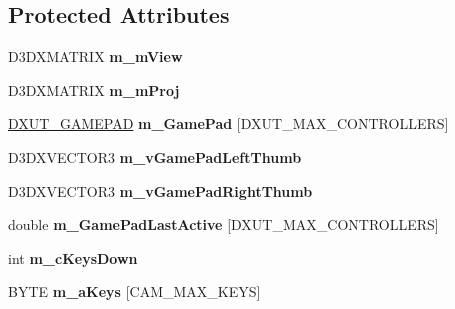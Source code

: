 \subsection*{Protected Attributes}
\begin{DoxyCompactItemize}
\item 
\hypertarget{class_c_base_camera_aa4e76560bdadc557f2e279e8ab00e405}{D3\+D\+X\+M\+A\+T\+R\+I\+X {\bfseries m\+\_\+m\+View}}\label{class_c_base_camera_aa4e76560bdadc557f2e279e8ab00e405}

\item 
\hypertarget{class_c_base_camera_a97b8a160735a4b812e7d3e2637d2025c}{D3\+D\+X\+M\+A\+T\+R\+I\+X {\bfseries m\+\_\+m\+Proj}}\label{class_c_base_camera_a97b8a160735a4b812e7d3e2637d2025c}

\item 
\hypertarget{class_c_base_camera_a944fb74264227b610464a055a6d8c9c4}{\hyperlink{struct_d_x_u_t___g_a_m_e_p_a_d}{D\+X\+U\+T\+\_\+\+G\+A\+M\+E\+P\+A\+D} {\bfseries m\+\_\+\+Game\+Pad} \mbox{[}D\+X\+U\+T\+\_\+\+M\+A\+X\+\_\+\+C\+O\+N\+T\+R\+O\+L\+L\+E\+R\+S\mbox{]}}\label{class_c_base_camera_a944fb74264227b610464a055a6d8c9c4}

\item 
\hypertarget{class_c_base_camera_a82a20dcc1d03a97e52f9f336b0f0e33b}{D3\+D\+X\+V\+E\+C\+T\+O\+R3 {\bfseries m\+\_\+v\+Game\+Pad\+Left\+Thumb}}\label{class_c_base_camera_a82a20dcc1d03a97e52f9f336b0f0e33b}

\item 
\hypertarget{class_c_base_camera_a1b9e69b2140314515049b30091d9a788}{D3\+D\+X\+V\+E\+C\+T\+O\+R3 {\bfseries m\+\_\+v\+Game\+Pad\+Right\+Thumb}}\label{class_c_base_camera_a1b9e69b2140314515049b30091d9a788}

\item 
\hypertarget{class_c_base_camera_ae2731931f0485bb49b9f3178f9aabe6f}{double {\bfseries m\+\_\+\+Game\+Pad\+Last\+Active} \mbox{[}D\+X\+U\+T\+\_\+\+M\+A\+X\+\_\+\+C\+O\+N\+T\+R\+O\+L\+L\+E\+R\+S\mbox{]}}\label{class_c_base_camera_ae2731931f0485bb49b9f3178f9aabe6f}

\item 
\hypertarget{class_c_base_camera_ae12aee70bbb423a26ae9ea2161a6eacc}{int {\bfseries m\+\_\+c\+Keys\+Down}}\label{class_c_base_camera_ae12aee70bbb423a26ae9ea2161a6eacc}

\item 
\hypertarget{class_c_base_camera_aab24266faedbce6a95ca36c23726064c}{B\+Y\+T\+E {\bfseries m\+\_\+a\+Keys} \mbox{[}C\+A\+M\+\_\+\+M\+A\+X\+\_\+\+K\+E\+Y\+S\mbox{]}}\label{class_c_base_camera_aab24266faedbce6a95ca36c23726064c}


\end{DoxyCompactItemize}
